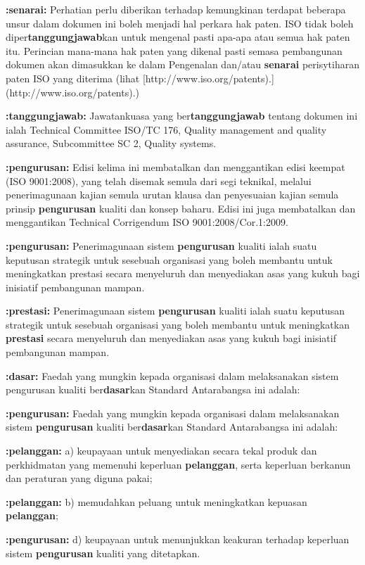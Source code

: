 \documentclass{article}
\begin{document}
\textbf{:senarai:} Perhatian perlu diberikan terhadap kemungkinan terdapat beberapa unsur dalam dokumen ini
boleh menjadi hal perkara hak paten. ISO tidak boleh diper\textbf{tanggungjawab}kan untuk
mengenal pasti apa-apa atau semua hak paten itu. Perincian mana-mana hak paten yang
dikenal pasti semasa pembangunan dokumen akan dimasukkan ke dalam Pengenalan
dan/atau \textbf{senarai} perisytiharan paten ISO yang diterima (lihat [http://www.iso.org/patents).](http://www.iso.org/patents).)

\textbf{:tanggungjawab:} Jawatankuasa yang ber\textbf{tanggungjawab} tentang dokumen ini ialah Technical Committee
ISO/TC 176, Quality management and quality assurance, Subcommittee SC 2, Quality
systems.

\textbf{:pengurusan:} Edisi kelima ini membatalkan dan menggantikan edisi keempat (ISO 9001:2008), yang telah
disemak semula dari segi teknikal, melalui penerimagunaan kajian semula urutan klausa dan
penyesuaian kajian semula prinsip \textbf{pengurusan} kualiti dan konsep baharu. Edisi ini juga
membatalkan dan menggantikan Technical Corrigendum ISO 9001:2008/Cor.1:2009.

\textbf{:pengurusan:} Penerimagunaan sistem \textbf{pengurusan} kualiti ialah suatu keputusan strategik untuk sesebuah
organisasi yang boleh membantu untuk meningkatkan prestasi secara menyeluruh dan
menyediakan asas yang kukuh bagi inisiatif pembangunan mampan.

\textbf{:prestasi:} Penerimagunaan sistem \textbf{pengurusan} kualiti ialah suatu keputusan strategik untuk sesebuah
organisasi yang boleh membantu untuk meningkatkan \textbf{prestasi} secara menyeluruh dan
menyediakan asas yang kukuh bagi inisiatif pembangunan mampan.

\textbf{:dasar:} Faedah yang mungkin kepada organisasi dalam melaksanakan sistem pengurusan kualiti
ber\textbf{dasar}kan Standard Antarabangsa ini adalah:

\textbf{:pengurusan:} Faedah yang mungkin kepada organisasi dalam melaksanakan sistem \textbf{pengurusan} kualiti
ber\textbf{dasar}kan Standard Antarabangsa ini adalah:

\textbf{:pelanggan:} a) keupayaan untuk menyediakan secara tekal produk dan perkhidmatan yang memenuhi
keperluan \textbf{pelanggan}, serta keperluan berkanun dan peraturan yang diguna pakai;

\textbf{:pelanggan:} b) memudahkan peluang untuk meningkatkan kepuasan \textbf{pelanggan};

\textbf{:pengurusan:} d) keupayaan untuk menunjukkan keakuran terhadap keperluan sistem \textbf{pengurusan} kualiti
yang ditetapkan.
\end{document}
